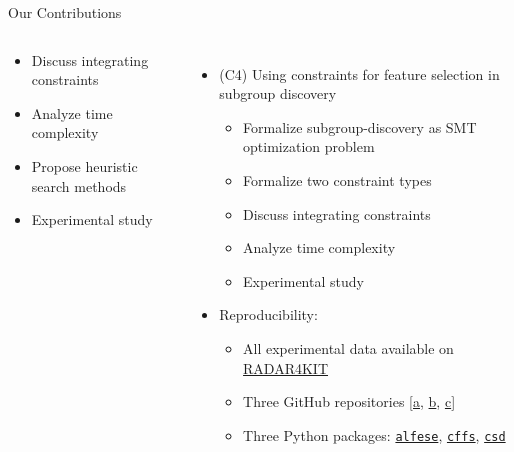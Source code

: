 \documentclass[en, navbarinline, handout]{sdqbeamer}
\begin{document}
\begin{frame}[t]{Our Contributions}
\begin{columns}
\begin{itemize}
\begin{itemize}
				\item Discuss integrating constraints
				\item Analyze time complexity
				\item Propose heuristic search methods
				\item Experimental study
			\end{itemize}
		\end{itemize}
		\pause
		\begin{itemize}
			\item (C4) Using constraints for feature selection in subgroup discovery \cite{bach2025subgroup, bach2024using}
			\begin{itemize}
				\item Formalize subgroup-discovery as SMT optimization problem
				\item Formalize two constraint types
				\item Discuss integrating constraints
				\item Analyze time complexity
				\item Experimental study
			\end{itemize}
			\pause
			\item Reproducibility:
			\begin{itemize}
				\item All experimental data available on \href{https://doi.org/10.35097/4kjyeg0z2bxmr6eh}{RADAR4KIT}
				\item Three GitHub repositories [\href{https://github.com/Jakob-Bach/Constrained-Filter-Feature-Selection}{a}, \href{https://github.com/Jakob-Bach/Alternative-Feature-Selection}{b}, \href{https://github.com/Jakob-Bach/Constrained-Subgroup-Discovery}{c}]
				\item Three Python packages: \href{https://pypi.org/project/alfese/}{\texttt{alfese}}, \href{https://pypi.org/project/cffs/}{\texttt{cffs}}, \href{https://pypi.org/project/csd/}{\texttt{csd}}
			\end{itemize}
		\end{itemize}
	\end{columns}
\end{frame}
\end{document}
